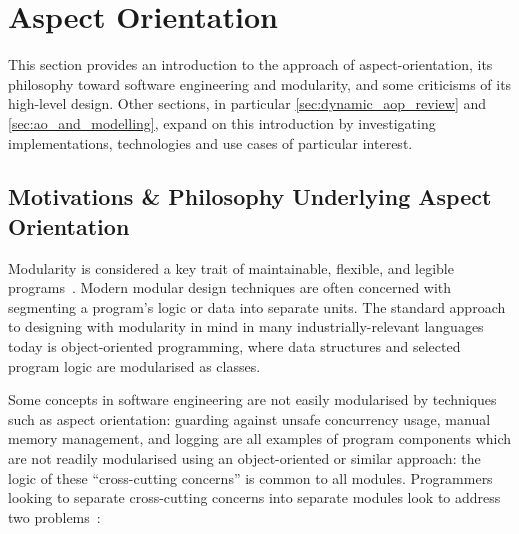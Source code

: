 

\section{Aspect Orientation}\label{lit_review_AOP_explainer}

This section provides an introduction to the approach of aspect-orientation, its
philosophy toward software engineering and modularity, and some criticisms of
its high-level design. Other sections, in particular
\cref{sec:dynamic_aop_review} and \cref{sec:ao_and_modelling}, expand on this
introduction by investigating implementations, technologies and use cases of
particular interest.

\subsection{Motivations \& Philosophy Underlying Aspect Orientation}
\label{review_aop_motivations_and_philosophy}

Modularity is considered a key trait of maintainable, flexible, and legible
programs~\cite{parnas_1972}. Modern modular design techniques are often
concerned with segmenting a program's logic or data into separate units. The
standard approach to designing with modularity in mind in many
industrially-relevant languages today is object-oriented programming, where
data structures and selected program logic are modularised as
classes.

Some concepts in software engineering are not easily modularised by techniques
such as aspect orientation: guarding against unsafe concurrency usage, manual
memory management, and logging are all examples of program components which are
not readily modularised using an object-oriented or similar approach: the logic
of these ``cross-cutting concerns'' is common to all modules. Programmers
looking to separate cross-cutting concerns into separate modules look to
address two problems~\cite{kiczales1997aspect}:

